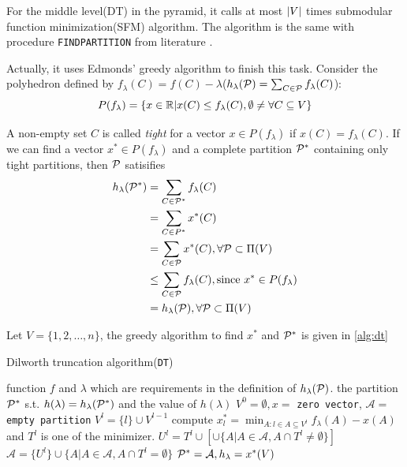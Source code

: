 \documentclass{article}
\begin{document}
For the middle level(DT) in the pyramid, it calls at most $\abs{V}$ times submodular function minimization(SFM) algorithm.
The algorithm is the same with procedure \texttt{FINDPARTITION} from literature \cite{mac}.

Actually, it uses Edmonds' greedy algorithm to finish this task. Consider the polyhedron defined by $f_{\lambda}(C) = f(C)-\lambda$($h_{\lambda}(\P)= \sum_{C \in \P} f_{\lambda}(C)$):
\begin{equation}
P(f_{\lambda}) = \{ x \in \R |  x(C) \leq f_{\lambda}(C), \emptyset \neq \forall C \subseteq V\}
\end{equation}

A non-empty set $C$ is called \textit{tight} for a vector $x \in P(f_{\lambda})$ if $x(C) = f_{\lambda}(C)$.
If we can find a vector $ x^* \in P(f_{\lambda}) $ and a complete partition $\P^*$ containing only tight partitions,
then $\P$ satisifies
\begin{align*}
h_{\lambda}(\P^*) &= \sum_{C \in \P^*} f_{\lambda}(C) \\
 &=\sum_{C\in P^*} x^*(C)  \\
& = \sum_{C \in \P} x^*(C), \forall \P \subset \Pi(V) \\
& \leq \sum_{C\in \P} f_{\lambda}(C), \textrm{since } x^* \in P(f_{\lambda}) \\
& = h_{\lambda}(\P),\forall \P \subset \Pi(V) 
\end{align*}

Let $V=\{1, 2, \dots, n\}$, the greedy algorithm to find $x^*$ and $\P^*$ is given in \ref{alg:dt}
\begin{algorithm}
\caption{Dilworth truncation algorithm(\texttt{DT})}\label{alg:dt}
\begin{algorithmic}[1]
\REQUIRE function $f$ and $\lambda$ which are requirements in the definition of $h_{\lambda}(\P)$.
\ENSURE the partition $\P^*$ s.t. $h(\lambda) = h_{\lambda}(\P^*)$ and the value of $h(\lambda)$
\STATE $V^0 = \emptyset, x = $ \texttt{zero vector}, $\mathcal{A} = $ \texttt{empty partition} 
\STATE $V^l = \{l\} \cup V^{l-1}$
\STATE\label{alg:tight} compute $x^*_l = \displaystyle\min_{ A: l \in A \subseteq V^l} f_{\lambda}(A)- x(A)$ and $T^l$ is one of the minimizer.
\STATE $U^l = T^l \cup [\cup \{A | A \in \mathcal{A}, A \cap T^l \neq \emptyset\}] $
\STATE $\mathcal{A} = \{U^l\} \cup \{A | A \in \mathcal{A}, A \cap T^l = \emptyset \}$
\ENDFOR
\STATE $\P^* = \mathcal{A}, h_{\lambda} = x^*(V)$
\end{algorithmic}
\end{algorithm}
\end{document}

